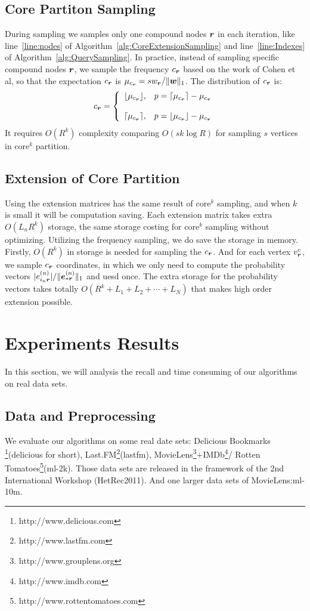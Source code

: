 \documentclass[letterpaper]{article}
\newcommand{\Sca}[3]{{#1}^{(#2)}_{i_#2#3}}%
\newcommand{\V}[1]{{\boldsymbol{{\MakeLowercase{#1}}}}}
\newcommand{\VnC}[3]{\V{#1}^{(#2)}_{#3}}
\newcommand{\norm}[2]{\|#1\|_{#2}}
\newcommand{\AlgLine}[2]{line~\ref{line:#2} of Algorithm~\ref{alg:#1}}
\begin{document}
\subsection{Core Partiton Sampling}
During sampling we samples only one compound nodes $\V{r}$ in each iteration,
like \AlgLine{CoreExtensionSampling}{nodes} and \AlgLine{QuerySampling}{Indexes}.
In practice, instead of sampling specific compound nodes $\V{r}$, 
we sample the frequency $c_\V{r}$ based on the work of Cohen et al,
so that the expectation $c_\V{r}$ is $\mu_{c_\V{r}}=sw_\V{r}/\norm{\V{w}}{1}$.
The distribution of $c_\V{r}$ is:
\begin{equation*}c_\V{r}=
    \left\{
      \begin{array}{ll}
        \lfloor \mu_{c_\V{r}} \rfloor,
        & \hbox{$p=\lceil \mu_{c_\V{r}} \rceil - \mu_{c_\V{r}}$} \\\\
        \lceil \mu_{c_\V{r}} \rceil,
        & \hbox{$p=\lfloor \mu_{c_\V{r}} \rfloor - \mu_{c_\V{r}}$}
      \end{array}
    \right.
\end{equation*}
It requires $O(R^k)$ complexity comparing $O(sk\log{R})$
for sampling $s$ vertices in core$^k$ partition.
\subsection{Extension of Core Partition}
Using the extension matrices has the same result of core$^k$ sampling,
and when $k$ is small it will be computation saving.
Each extension matrix takes extra $O(L_nR^k)$ storage,
the same storage costing for core$^k$ sampling without optimizing.
Utilizing the frequency sampling, we do save the storage in memory.
Firstly, $O(R^k)$ in storage is needed for sampling the $c_\V{r}$.
And for each vertex $v^c_{\V{r}}$,
we sample $c_{\V{r}}$ coordinates,
in which we only need to compute the probability vectors
$|\Sca{e}{n}{\V{r}}|/\norm{\VnC{e}{n}{*\V{r}}}{1}$ and uesd once.
The extra storage for the probability vectors takes totally
$O(R^k + L_1 + L_2 + \cdots + L_N)$
that makes high order extension possible.
\section{Experiments Results}
In this section, we will analysis the recall
and time consuming of our algorithms on real data sets.

\subsection{Data and Preprocessing}
We evaluate our algorithms on some real date sets:
Delicious Bookmarks
\footnote{http://www.delicious.com}(delicious for short),
Last.FM\footnote{http://www.lastfm.com}(lastfm),
MovieLens\footnote{http://www.grouplens.org}+IMDb\footnote{http://www.imdb.com }/
Rotten Tomatoes\footnote{http://www.rottentomatoes.com}(ml-2k).
Those data sets are released in the framework of the 2nd International Workshop (HetRec2011).
And one larger data sets of MovieLens\cite{Harper2015}:ml-10m.
\end{document}
